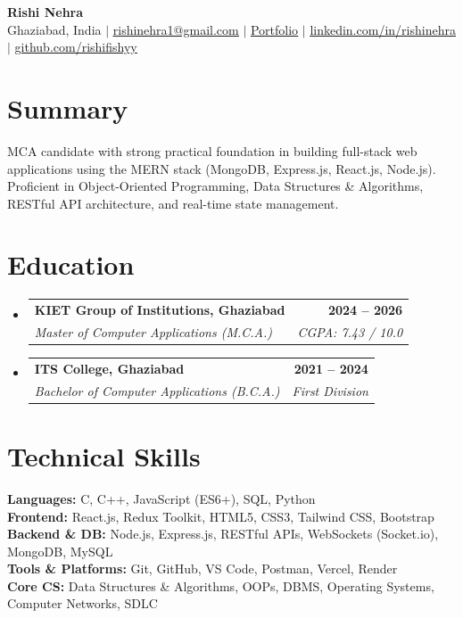 \documentclass[letterpaper,10pt]{article}
\makeatletter
\newcommand{\resumeSubheading}[4]{
  \item
    \begin{tabular*}{1.0\textwidth}[t]{l@{\extracolsep{\fill}}r}
      \textbf{#1} & \textbf{\small #2} \\
      \textit{\small#3} & \textit{\small #4} \\
    \end{tabular*}\vspace{-3pt}
}
\newcommand{\resumeSubHeadingListStart}{\begin{itemize}[leftmargin=0.0in, label={}, itemsep=3pt]}
\newcommand{\resumeSubHeadingListEnd}{\end{itemize}}
\makeatother
\begin{document}
\begin{center}
    {\Huge \textbf{Rishi Nehra}} \\ \vspace{5pt}
    \small
    Ghaziabad, India \quad$|$\quad
    \href{mailto:rishinehra1@gmail.com}{\underline{rishinehra1@gmail.com}} \quad$|$\quad
    \href{https://yourportfolio.com}{\underline{Portfolio}} \quad$|$\quad
    \href{https://linkedin.com/in/rishinehra}{\underline{linkedin.com/in/rishinehra}} \quad$|$\quad
    \href{https://github.com/rishifishyy}{\underline{github.com/rishifishyy}}
\end{center}

\section{Summary}
\small{MCA candidate with strong practical foundation in building full-stack web applications using the MERN stack (MongoDB, Express.js, React.js, Node.js). Proficient in Object-Oriented Programming, Data Structures \& Algorithms, RESTful API architecture, and real-time state management.}

\section{Education}
  \resumeSubHeadingListStart
    \resumeSubheading
      {KIET Group of Institutions, Ghaziabad}{2024 -- 2026}
      {Master of Computer Applications (M.C.A.)}{CGPA: 7.43 / 10.0}
    \resumeSubheading
      {ITS College, Ghaziabad}{2021 -- 2024}
      {Bachelor of Computer Applications (B.C.A.)}{First Division}
  \resumeSubHeadingListEnd

\section{Technical Skills}
 \begin{itemize}[leftmargin=0.0in, label={}, itemsep=2.5pt]
    \small{\item{
     \textbf{Languages:} C, C++, JavaScript (ES6+), SQL, Python \\
     \textbf{Frontend:} React.js, Redux Toolkit, HTML5, CSS3, Tailwind CSS, Bootstrap \\
     \textbf{Backend \& DB:} Node.js, Express.js, RESTful APIs, WebSockets (Socket.io), MongoDB, MySQL \\
     \textbf{Tools \& Platforms:} Git, GitHub, VS Code, Postman, Vercel, Render \\
     \textbf{Core CS:} Data Structures \& Algorithms, OOPs, DBMS, Operating Systems, Computer Networks, SDLC
    }}
 \end{itemize}
\end{document}
